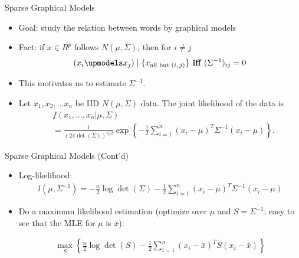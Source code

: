 \documentclass[12pt]{beamer}
\newcommand{\1}[1]{{\mathbf 1}\left\{#1\right\}}        %
\def\lp{\left(}
\def\rp{\right)}
\begin{document}
\begin{frame}[fragile]{Sparse Graphical Models}

\begin{itemize}[<+->]
\item Goal: study the relation between words by graphical models
\item Fact: if $x\in R^p$ follows $N(\mu,\Sigma)$, then for $i\ne j$
\begin{align*}
(x_i  \upmodels %
x_j )\mid \{x_{\text{all but $(i,j)$}}\} \textbf{ iff } (\Sigma^{-1})_{ij}=0
\end{align*}
\item This motivates us to estimate $\Sigma^{-1}$.
\item Let $x_1,x_2,...x_n$ be IID $N(\mu,\Sigma)$ data. The joint likelihood of the data is
\begin{align*}
& f(x_1, \dots, x_n|\mu,\Sigma) 
\\&= \frac{1}{(2\pi \det\lp \Sigma\rp)^{n/2}}\exp\left\{ -\frac{1}{2} \sum_{i=1}^n(x_i-\mu)^T\Sigma^{-1}(x_i-\mu) \right\}.
\end{align*}

\end{itemize}

\end{frame}


\begin{frame}[fragile]{Sparse Graphical Models (Cont'd)}

\begin{itemize}[<+->]
\item  Log-likelihood:
\begin{align*}
l(\mu,\Sigma^{-1}) = -\frac{n}{2}\log \det \lp \Sigma \rp  -\frac{1}{2} \sum_{i=1}^n(x_i-\mu)^T\Sigma^{-1}(x_i-\mu)
\end{align*}

\item Do a maximum likelihood estimation (optimize over $\mu$ and $S = \Sigma^{-1}$; easy to see that the MLE for $\mu$ is $\bar{x}$):

\begin{align*}
\max_S\left\{  \frac{n}{2}\log \det\lp S \rp  -\frac{1}{2} \sum_{i=1}^n(x_i-\bar{x})^T S (x_i-\bar{x})\right\} 
\end{align*}


\end{itemize}

\end{frame}
\end{document}
